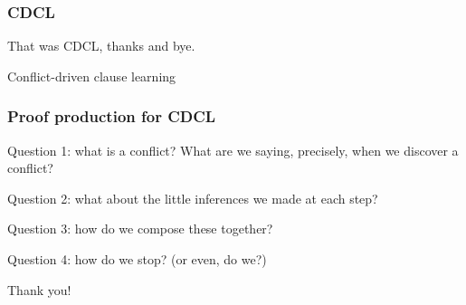 \documentclass[
  aspectratio=1610, 
  xcolor={dvipsnames},
]{beamer}
\begin{document}
\begin{frame}
  \frametitle{CDCL}

  \pause
  That was CDCL, thanks and bye.

  \pause
  \begin{center}
    Conflict-driven clause learning
  \end{center}



\end{frame}

\begin{frame}
  \frametitle{Proof production for CDCL}

  Question 1: what is a conflict? What are we saying, precisely, when we
  discover a conflict?

  \pause
  Question 2: what about the little inferences we made at each step?

  \pause
  Question 3: how do we compose these together?

  \pause
  Question 4: how do we stop? (or even, do we?)

\end{frame}





\begin{frame}

  \begin{center}
    \Huge Thank you!
  \end{center}

\end{frame}



\end{document}
